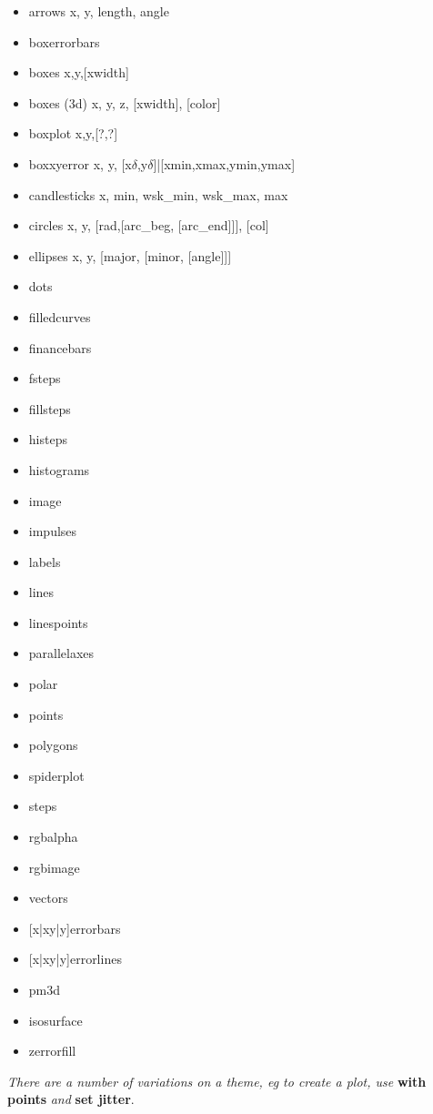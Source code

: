 {\footnotesize
\begin{itemize}
    \item arrows \quad x, y, length, angle
    \item boxerrorbars \quad 
    \item boxes \quad x,y,[xwidth]
    \item boxes (3d) \quad x, y, z, [xwidth], [color]
    \item boxplot \quad x,y,[?,?]
    \item boxxyerror \quad x, y, [x$\delta$,y$\delta$]|[xmin,xmax,ymin,ymax]
    \item candlesticks \quad x, min, wsk\_min, wsk\_max, max
    \item circles \quad x, y, [rad,[arc\_beg, [arc\_end]]], [col]
    \item ellipses \quad x, y, [major, [minor, [angle]]]
    \item dots
    \item filledcurves
    \item financebars
    \item fsteps
    \item fillsteps
    \item histeps
    \item histograms
    \item image
    \item impulses
    \item labels
    \item lines
    \item linespoints
    \item parallelaxes
    \item polar 
    \item points
    \item polygons
    \item spiderplot
    \item steps
    \item rgbalpha
    \item rgbimage
    \item vectors
    \item {[x|xy|y]}errorbars
    \item {[x|xy|y]}errorlines
    \item pm3d
    \item isosurface
    \item zerrorfill
\end{itemize}}

\textit{There are a number of variations on a theme, eg to create a  plot, use }\textbf{with points}\textit{ and }\textbf{set jitter}.

